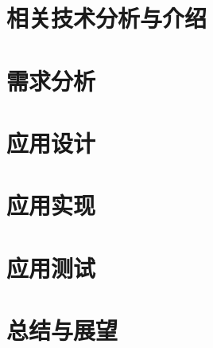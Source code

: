 \documentclass{ecnuthesis}
\begin{document}
    \chapter{相关技术分析与介绍}\label{ch:tech}


    \chapter{需求分析}\label{ch:requirement}


    \chapter{应用设计}\label{ch:design}


    \chapter{应用实现}\label{ch:implement}


    \chapter{应用测试}\label{ch:test}


    \chapter{总结与展望}\label{ch:conclusion}


    \backmatter
    \PrintReference

    \begin{appendix}
    \end{appendix}

    \begin{acknowledgement}
    \end{acknowledgement}
\end{document}
